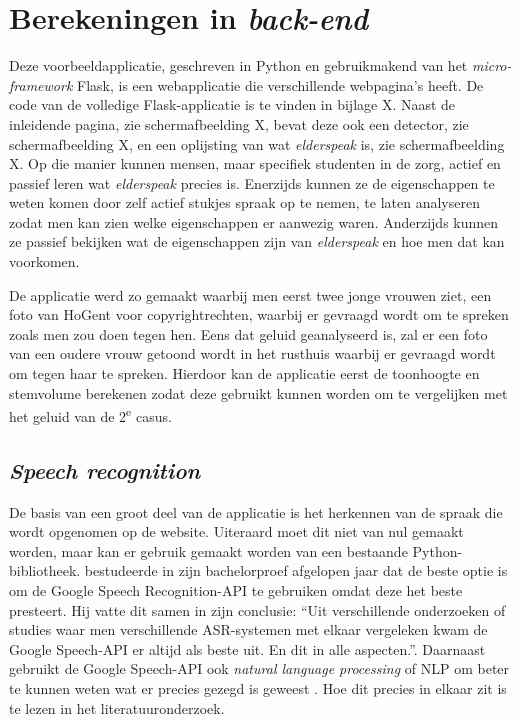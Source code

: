 \section{Berekeningen in \textit{back-end}}
Deze voorbeeldapplicatie, geschreven in Python en gebruikmakend van het \textit{micro-framework} Flask, is een webapplicatie die verschillende webpagina’s heeft. De code van de volledige Flask-applicatie is te vinden in bijlage X. Naast de inleidende pagina, zie schermafbeelding X, bevat deze ook een detector, zie schermafbeelding X, en een oplijsting van wat \textit{elderspeak} is, zie schermafbeelding X. Op die manier kunnen mensen, maar specifiek studenten in de zorg, actief en passief leren wat \textit{elderspeak} precies is. Enerzijds kunnen ze de eigenschappen te weten komen door zelf actief stukjes spraak op te nemen, te laten analyseren zodat men kan zien welke eigenschappen er aanwezig waren. Anderzijds kunnen ze passief bekijken wat de eigenschappen zijn van \textit{elderspeak} en hoe men dat kan voorkomen.

De applicatie werd zo gemaakt waarbij men eerst twee jonge vrouwen ziet, een foto van HoGent voor copyrightrechten, waarbij er gevraagd wordt om te spreken zoals men zou doen tegen hen. Eens dat geluid geanalyseerd is, zal er een foto van een oudere vrouw getoond wordt in het rusthuis waarbij er gevraagd wordt om tegen haar te spreken. Hierdoor kan de applicatie eerst de toonhoogte en stemvolume berekenen zodat deze gebruikt kunnen worden om te vergelijken met het geluid van de 2\textsuperscript{e} casus.

\subsection{\textit{Speech recognition}}
De basis van een groot deel van de applicatie is het herkennen van de spraak die wordt opgenomen op de website. Uiteraard moet dit niet van nul gemaakt worden, maar kan er gebruik gemaakt worden van een bestaande Python-bibliotheek. \textcite{Standaert2021} bestudeerde in zijn bachelorproef afgelopen jaar dat de beste optie is om de Google Speech Recognition-API te gebruiken omdat deze het beste presteert. Hij vatte dit samen in zijn conclusie: ``Uit verschillende onderzoeken of studies waar men verschillende ASR-systemen met elkaar vergeleken kwam de Google Speech-API er altijd als beste uit. En dit in alle aspecten.''. Daarnaast gebruikt de Google Speech-API ook \textit{natural language processing} of NLP om beter te kunnen weten wat er precies gezegd is geweest \autocite{GoogleCloud2022}. Hoe dit precies in elkaar zit is te lezen in het literatuuronderzoek.

